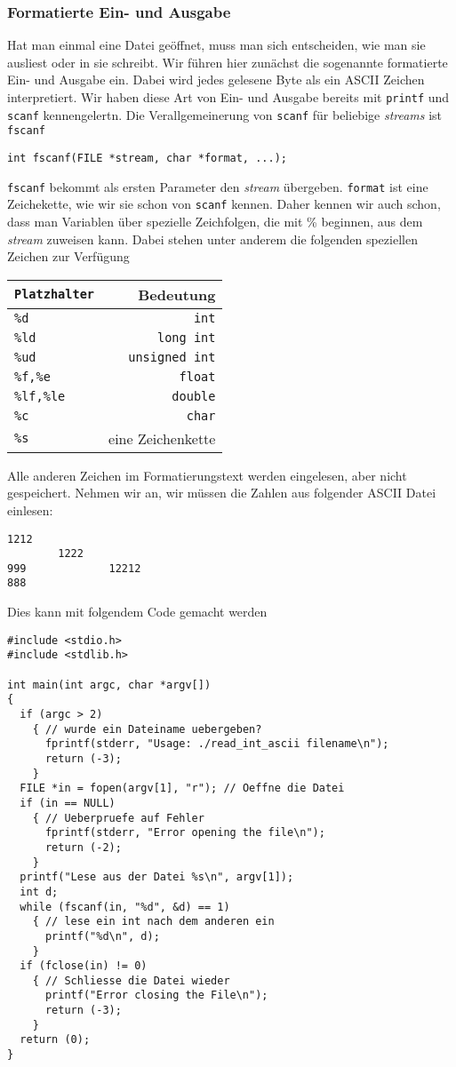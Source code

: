 \subsubsection{Formatierte Ein- und Ausgabe}

Hat man einmal eine Datei geöffnet, muss man sich entscheiden, wie man sie ausliest oder in sie schreibt.
Wir führen hier zunächst die sogenannte formatierte Ein- und Ausgabe ein.
Dabei wird jedes gelesene Byte als ein ASCII Zeichen interpretiert.
Wir haben diese Art von Ein- und Ausgabe bereits mit \verb|printf| und \verb|scanf| kennengelertn.
Die Verallgemeinerung von \verb|scanf| für beliebige \emph{streams} ist \verb|fscanf|
\begin{lstlisting}
int fscanf(FILE *stream, char *format, ...);
\end{lstlisting}
\verb|fscanf| bekommt als ersten Parameter den \emph{stream} übergeben.
\verb|format| ist eine Zeichekette, wie wir sie schon von \verb|scanf| kennen.
Daher kennen wir auch schon, dass man Variablen über spezielle Zeichfolgen, die mit \% beginnen, aus dem \emph{stream} zuweisen kann.
Dabei stehen unter anderem die folgenden speziellen Zeichen zur Verfügung
\begin{center}
  \begin{tabular}{lr}
    \hline
    \texttt{Platzhalter} & Bedeutung \\\hline
    \texttt{\%d}	&  \texttt{int} \\
    \texttt{\%ld}  &  \texttt{long int} \\
    \texttt{\%ud}  &  \texttt{unsigned int} \\
    \texttt{\%f,\%e}   & \texttt{float} \\
    \texttt{\%lf,\%le}  & \texttt{double} \\
    \texttt{\%c}  & \texttt{char} \\
    \texttt{\%s}  & eine Zeichenkette\\
    \hline
  \end{tabular}
\end{center}
Alle anderen Zeichen im Formatierungstext werden eingelesen, aber nicht gespeichert. 
Nehmen wir an, wir müssen die Zahlen aus folgender ASCII Datei einlesen:
\begin{verbatim}
1212
        1222
999             12212
888
\end{verbatim}
Dies kann mit folgendem Code gemacht werden
\begin{lstlisting}
#include <stdio.h>
#include <stdlib.h>

int main(int argc, char *argv[])
{
  if (argc > 2)
    { // wurde ein Dateiname uebergeben?
      fprintf(stderr, "Usage: ./read_int_ascii filename\n");
      return (-3);
    }
  FILE *in = fopen(argv[1], "r"); // Oeffne die Datei
  if (in == NULL)
    { // Ueberpruefe auf Fehler
      fprintf(stderr, "Error opening the file\n");
      return (-2);
    }
  printf("Lese aus der Datei %s\n", argv[1]);
  int d;
  while (fscanf(in, "%d", &d) == 1)
    { // lese ein int nach dem anderen ein
      printf("%d\n", d);
    }
  if (fclose(in) != 0)
    { // Schliesse die Datei wieder
      printf("Error closing the File\n");
      return (-3);
    }
  return (0);
}
\end{lstlisting}
